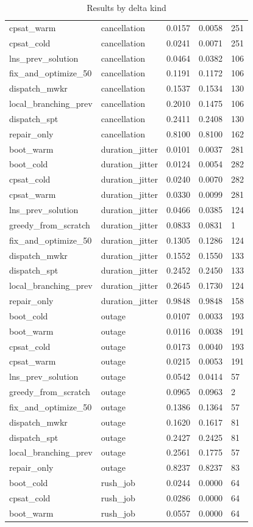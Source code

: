 \begin{table}[t]
\begin{tabular}{lllll}
cpsat\_warm & cancellation & 0.0157 & 0.0058 & 251 \\
cpsat\_cold & cancellation & 0.0241 & 0.0071 & 251 \\
lns\_prev\_solution & cancellation & 0.0464 & 0.0382 & 106 \\
fix\_and\_optimize\_50 & cancellation & 0.1191 & 0.1172 & 106 \\
dispatch\_mwkr & cancellation & 0.1537 & 0.1534 & 130 \\
local\_branching\_prev & cancellation & 0.2010 & 0.1475 & 106 \\
dispatch\_spt & cancellation & 0.2411 & 0.2408 & 130 \\
repair\_only & cancellation & 0.8100 & 0.8100 & 162 \\
boot\_warm & duration\_jitter & 0.0101 & 0.0037 & 281 \\
boot\_cold & duration\_jitter & 0.0124 & 0.0054 & 282 \\
cpsat\_cold & duration\_jitter & 0.0240 & 0.0070 & 282 \\
cpsat\_warm & duration\_jitter & 0.0330 & 0.0099 & 281 \\
lns\_prev\_solution & duration\_jitter & 0.0466 & 0.0385 & 124 \\
greedy\_from\_scratch & duration\_jitter & 0.0833 & 0.0831 & 1 \\
fix\_and\_optimize\_50 & duration\_jitter & 0.1305 & 0.1286 & 124 \\
dispatch\_mwkr & duration\_jitter & 0.1552 & 0.1550 & 133 \\
dispatch\_spt & duration\_jitter & 0.2452 & 0.2450 & 133 \\
local\_branching\_prev & duration\_jitter & 0.2645 & 0.1730 & 124 \\
repair\_only & duration\_jitter & 0.9848 & 0.9848 & 158 \\
boot\_cold & outage & 0.0107 & 0.0033 & 193 \\
boot\_warm & outage & 0.0116 & 0.0038 & 191 \\
cpsat\_cold & outage & 0.0173 & 0.0040 & 193 \\
cpsat\_warm & outage & 0.0215 & 0.0053 & 191 \\
lns\_prev\_solution & outage & 0.0542 & 0.0414 & 57 \\
greedy\_from\_scratch & outage & 0.0965 & 0.0963 & 2 \\
fix\_and\_optimize\_50 & outage & 0.1386 & 0.1364 & 57 \\
dispatch\_mwkr & outage & 0.1620 & 0.1617 & 81 \\
dispatch\_spt & outage & 0.2427 & 0.2425 & 81 \\
local\_branching\_prev & outage & 0.2561 & 0.1775 & 57 \\
repair\_only & outage & 0.8237 & 0.8237 & 83 \\
boot\_cold & rush\_job & 0.0244 & 0.0000 & 64 \\
cpsat\_cold & rush\_job & 0.0286 & 0.0000 & 64 \\
boot\_warm & rush\_job & 0.0557 & 0.0000 & 64 \\
\bottomrule
\end{tabular}
\caption{Results by delta kind}
\label{tab:by-delta}
\end{table}
